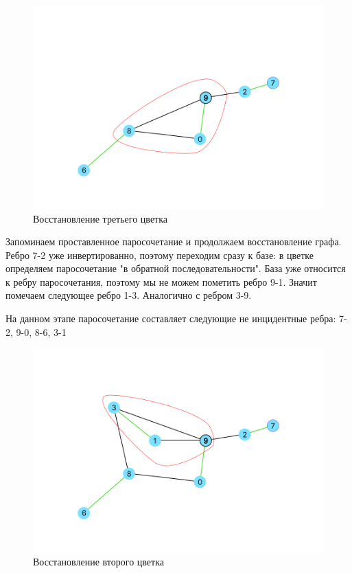 \documentclass[14pt, a4paper]{extarticle}
\begin{document}
    \begin{figure}[h!]
        \centering
        \includegraphics[scale=0.3]{6.png}
        \caption{Восстановление третьего цветка}
        \label{fig:my_label}
    \end{figure} 

    Запоминаем проставленное паросочетание и продолжаем восстановление графа. Ребро 7-2 уже инвертированно, поэтому переходим сразу к базе: в цветке определяем паросочетание "в обратной последовательности". База уже относится к ребру паросочетания, поэтому мы не можем пометить ребро 9-1. Значит помечаем следующее ребро 1-3. Аналогично с ребром 3-9.  

    На данном этапе паросочетание составляет следующие не инцидентные ребра:
    7-2, 9-0, 8-6, 3-1
    
    \begin{figure}[h!]
        \centering
        \includegraphics[scale=0.3]{8.png}
        \caption{Восстановление второго цветка}
        \label{fig:my_label}
    \end{figure} 
\end{document}
